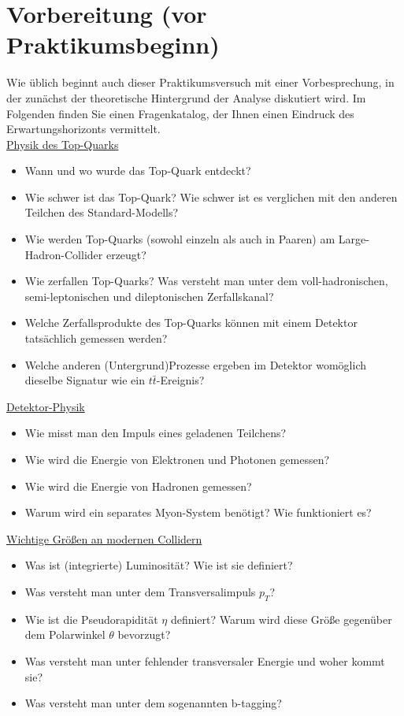 \section{Vorbereitung (vor Praktikumsbeginn)}
\label{tasks}
Wie \"ublich beginnt auch dieser Praktikumsversuch mit einer Vorbesprechung, in der zun\"achst der theoretische Hintergrund der Analyse diskutiert wird. Im Folgenden finden Sie einen Fragenkatalog, der Ihnen einen Eindruck des Erwartungshorizonts vermittelt.\\
\underline{Physik des Top-Quarks}
\begin{itemize}
	\item Wann und wo wurde das Top-Quark entdeckt?
	\item Wie schwer ist das Top-Quark? Wie schwer ist es verglichen mit den anderen Teilchen des Standard-Modells?
	\item Wie werden Top-Quarks (sowohl einzeln als auch in Paaren) am Large-Hadron-Collider erzeugt?
	\item Wie zerfallen Top-Quarks? Was versteht man unter dem voll-hadronischen, semi-leptonischen und dileptonischen Zerfallskanal?
	\item Welche Zerfallsprodukte des Top-Quarks k\"onnen mit einem Detektor tats\"achlich gemessen werden?
	\item Welche anderen (Untergrund)Prozesse ergeben im Detektor wom\"oglich dieselbe Signatur wie ein $t\bar{t}$-Ereignis?
\end{itemize}
\underline{Detektor-Physik}
\begin{itemize}
	\item Wie misst man den Impuls eines geladenen Teilchens?
	\item Wie wird die Energie von Elektronen und Photonen gemessen?
	\item Wie wird die Energie von Hadronen gemessen?
	\item Warum wird ein separates Myon-System ben\"otigt? Wie funktioniert es?
\end{itemize}
\underline{Wichtige Gr\"o\ss{}en an modernen Collidern}
\begin{itemize}
	\item Was ist (integrierte) Luminosit\"at? Wie ist sie definiert?
	\item Was versteht man unter dem Transversalimpuls $p_{T}$?
	\item Wie ist die Pseudorapidit\"at $\eta$ definiert? Warum wird diese Gr\"o\ss{}e gegen\"uber dem Polarwinkel $\theta$ bevorzugt?
	\item Was versteht man unter fehlender transversaler Energie und woher kommt sie?
	\item Was versteht man unter dem sogenannten b-tagging?
\end{itemize}
